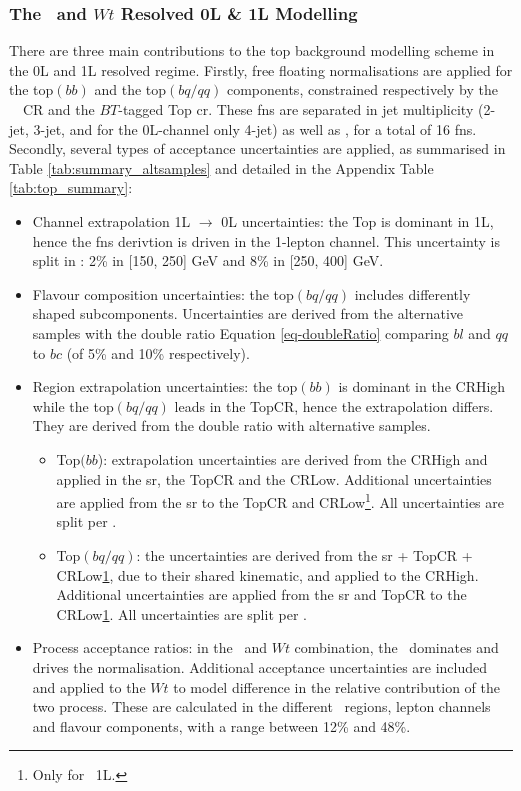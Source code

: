 \subsubsection{The \ttb\ and $Wt$ Resolved 0L \& 1L Modelling}
There are three main contributions to the top background modelling scheme in the 0L and 1L resolved regime. Firstly, free floating normalisations are applied for the top$(bb)$ and the top$(bq/qq)$ components, constrained respectively by the \vhb\ \highdr\ CR and the $BT$-tagged Top \gls{cr}. These \gls{fn}s are separated in jet multiplicity \nj (2-jet, 3-jet, and for the 0L-channel only 4-jet) as well as \ptv, for a total of 16 \gls{fn}s. Secondly, several types of acceptance uncertainties are applied, as summarised in Table \ref{tab:summary_altsamples} and detailed in the Appendix Table \ref{tab:top_summary}:
\begin{itemize}[leftmargin=*]
    \item Channel extrapolation 1L $\rightarrow$ 0L uncertainties: the Top is dominant in 1L, hence the \gls{fn}s derivtion is driven in the 1-lepton channel. This uncertainty is split in \ptv: 2\% in [150, 250] GeV and 8\% in [250, 400] GeV.
    \item Flavour composition uncertainties: the top$(bq/qq)$ includes differently shaped subcomponents. Uncertainties are derived from the alternative samples with the double ratio Equation \ref{eq-doubleRatio} comparing $bl$ and $qq$ to $bc$ (of 5\% and 10\% respectively). 
    \item Region extrapolation uncertainties: the top$(bb)$ is dominant in the CRHigh while the top$(bq/qq)$ leads in the TopCR, hence the extrapolation differs. They are derived from the double ratio with alternative samples.
    \begin{itemize}
        \item Top$(bb$): extrapolation uncertainties are derived from the CRHigh and applied in the \gls{sr}, the TopCR and the CRLow. Additional uncertainties are applied from the \gls{sr} to the TopCR and CRLow\footnote{\label{footnote-crlow}Only for \vhb\ 1L.}. All uncertainties are split per \ptv.
        \item Top$(bq/qq)$: the uncertainties are derived from the \gls{sr} + TopCR + CRLow\cref{footnote-crlow}, due to their shared kinematic, and applied to the CRHigh. Additional uncertainties are applied from the \gls{sr} and TopCR to the CRLow\cref{footnote-crlow}. All uncertainties are split per \ptv.
    \end{itemize}
    \item Process acceptance ratios: in the \ttb\ and $Wt$ combination, the \ttb\ dominates and drives the normalisation. Additional acceptance uncertainties are included and applied to the $Wt$ to model difference in the relative contribution of the two process. These are calculated in the different \ptv\ regions, lepton channels and flavour components, with a range between 12\% and 48\%.
\end{itemize}
